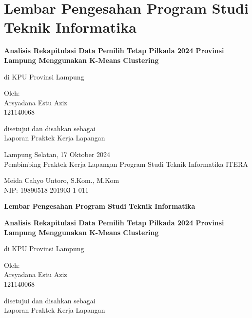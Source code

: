 
\section*{\centering \large Lembar Pengesahan Program Studi Teknik Informatika}

\setcounter{page}{2}

\begin{center}
\vspace{1cm}

\Large  %
\textbf{Analisis Rekapitulasi Data Pemilih Tetap Pilkada 2024 Provinsi Lampung Menggunakan K-Means Clustering}

\vspace{1cm}
\Large
di KPU Provinsi Lampung

\vspace{2cm}

\large  %
Oleh: \\
Arsyadana Estu Aziz  \\
121140068

\vspace{2cm}

\large  %
disetujui dan disahkan sebagai \\
Laporan Praktek Kerja Lapangan

\end{center}

\vfill

\noindent \normalsize  %
Lampung Selatan, 17 Oktober 2024 \\
Pembimbing Praktek Kerja Lapangan Program Studi Teknik Informatika ITERA

\vspace{3cm}

\noindent Meida Cahyo Untoro, S.Kom., M.Kom \\
NIP: 19890518 201903 1 011

\begin{center}
\large
\textbf{Lembar Pengesahan Program Studi Teknik Informatika}

\vspace{1cm}

\Large
\textbf{Analisis Rekapitulasi Data Pemilih Tetap Pilkada 2024 Provinsi Lampung Menggunakan K-Means Clustering}

\vspace{1cm}
\Large
di KPU Provinsi Lampung

\vspace{2cm}

Oleh: \\
Arsyadana Estu Aziz  \\
121140068

\vspace{2cm}

disetujui dan disahkan sebagai \\
Laporan Praktek Kerja Lapangan


\end{center}
\vfill

